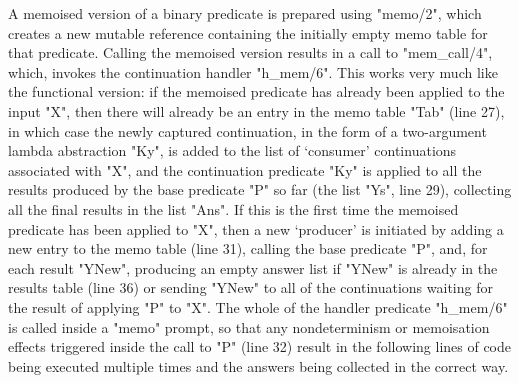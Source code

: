 A memoised version of a binary predicate is 
prepared using "memo/2", which creates a new mutable reference containing the initially
empty memo table for that predicate. Calling the memoised version results in a call to "mem_call/4", 
which, invokes the continuation handler "h_mem/6". This works very much like the
 functional version: if the memoised predicate has already been applied to
the input "X", then there will already be an entry in the memo table "Tab" (line 27), in which case the
newly captured continuation, in the form of a two-argument lambda abstraction "Ky", is added to the 
list of `consumer' continuations associated with "X", and the continuation predicate "Ky" is applied to all
the results produced by the base predicate "P" so far (the list "Ys", line 29), collecting all the 
final results in the list "Ans". If this is the first time the memoised predicate has been applied to 
"X", then a new `producer' is initiated  by adding a new entry to the memo table (line 31), calling the base
predicate "P", and, for each result "YNew", producing an empty answer list if "YNew" is 
already in the results table (line 36) or sending "YNew" to all of the continuations waiting for the
result of applying "P" to "X". The whole of the handler predicate "h_mem/6" is called inside a
"memo" prompt, so that any nondeterminism or memoisation effects triggered inside the call to "P" 
(line 32) result in the following lines of code being executed multiple times and the answers being collected
in the correct way.

